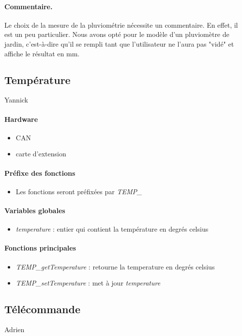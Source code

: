 \documentclass[a4paper]{report}
\begin{document}
\paragraph{Commentaire.}
Le choix de la mesure de la pluviométrie nécessite un commentaire. En effet, il est un peu particulier.
Nous avons opté pour le modèle d'un pluviomètre de jardin, c'est-à-dire qu'il se rempli tant que l'utilisateur ne l'aura pas "vidé" et affiche le résultat en mm.

\subsection{Température}
Yannick 
\paragraph{Hardware}
\begin{itemize}
\item CAN
\item carte d’extension
\end{itemize}
\paragraph{Préfixe des fonctions}
\begin{itemize}
\item Les fonctions seront préfixées par \emph{TEMP\_}
\end{itemize}
\paragraph{Variables globales}
\begin{itemize}
\item \emph{temperature} : entier qui contient la température en degrés celsius
\end{itemize}
\paragraph{Fonctions principales}
\begin{itemize}
\item \emph{TEMP\_getTemperature} : retourne la temperature en degrés celsius
\item \emph{TEMP\_setTemperature} : met à jour \emph{temperature}
\end{itemize}

\subsection{Télécommande}
Adrien 
\end{document}
